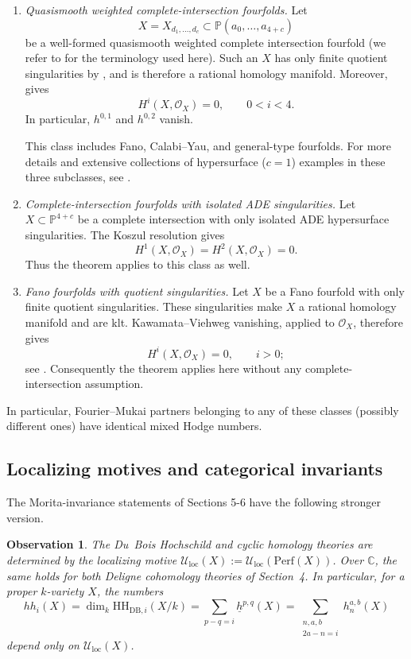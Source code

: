 \documentclass{amsart}
\theoremstyle{plain}
\newtheorem{obs}[prop]{Observation}
\theoremstyle{definition}
\newcommand{\bbC}{\mathbb{C}}
\newcommand{\Perf}{\mathrm{Perf}}
\newcommand{\Uloc}{\mathcal U_{\mathrm{loc}}}
\newcommand{\HH}{\mathrm{HH}}
\newcommand{\bbP}{\mathbb{P}}
\newcommand{\DB}{\mathrm{DB}}
\begin{document}
\begin{enumerate}
\item
\emph{Quasismooth weighted complete-intersection fourfolds.}
Let
\[
X=X_{d_1,\ldots,d_c}
\subset\bbP(a_0,\ldots,a_{4+c})
\]
be a well-formed quasismooth weighted complete intersection fourfold (we refer to \cite{BK16} for the terminology used here).
Such an $X$ has only finite quotient singularities by \cite[Theorem~3.1.6]{Dol82}, and is therefore a rational homology manifold. Moreover,
\cite[Theorem~3.2.4(iii)]{Dol82} gives
\[
H^i(X,\mathcal O_X)=0,\qquad 0<i<4.
\]
In particular, $h^{0,1}$ and $h^{0,2}$ vanish.

This class includes Fano, Calabi--Yau, and general-type fourfolds. For more details and extensive collections of hypersurface ($c=1$) examples in these three subclasses, see \cite{BK16}.

\item
\emph{Complete-intersection fourfolds with isolated ADE singularities.}
Let $X\subset\bbP^{4+c}$ be a complete intersection with only isolated ADE hypersurface singularities.
The Koszul resolution gives
\[
H^1(X,\mathcal O_X)=H^2(X,\mathcal O_X)=0.
\]
Thus the theorem applies to this class as well.

\item
\emph{Fano fourfolds with quotient singularities.}
Let $X$ be a Fano fourfold with only finite quotient singularities. These singularities make $X$ a rational homology manifold and are klt. Kawamata--Viehweg vanishing, applied to $\mathcal O_X$, therefore gives
\[
H^i(X,\mathcal O_X)=0,\qquad i>0;
\]
see \cite[Theorem~2.70]{KM98}.
Consequently the theorem applies here without any complete-intersection assumption.
\end{enumerate}

In particular, Fourier--Mukai partners belonging to any of these classes (possibly different ones) have identical mixed Hodge numbers.


\subsection{Localizing motives and categorical invariants}


The Morita-invariance statements of Sections 5-6
have the following stronger version.

\begin{obs}
The Du~Bois Hochschild and cyclic homology theories are determined by the localizing motive
$\Uloc(X):=\Uloc(\Perf(X))$.
Over $\bbC$, the same holds for both Deligne cohomology theories of Section~4.
In particular, for a proper $k$-variety $X$, the numbers
\[
hh_i(X)=\dim_k\HH_{\DB,i}(X/k)
=\sum_{p-q=i}\underline h^{p,q}(X)
=\sum_{\substack{n,a,b\\2a-n=i}}h_n^{a,b}(X)
\]
depend only on $\Uloc(X)$.
\end{obs}
\end{document}
